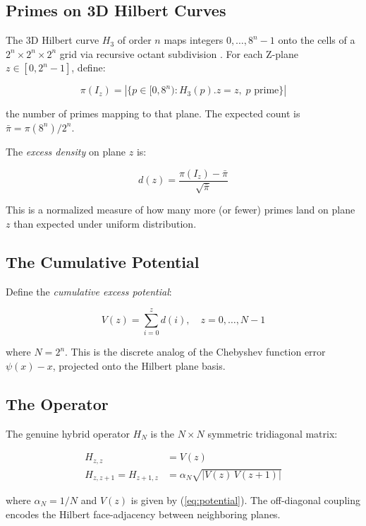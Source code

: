 \documentclass[11pt,a4paper]{article}
\theoremstyle{definition}
\begin{document}
\subsection{Primes on 3D Hilbert Curves}

The 3D Hilbert curve $H_3$ of order $n$ maps integers
$0,\ldots,8^n-1$ onto the cells of a $2^n \times 2^n \times 2^n$
grid via recursive octant subdivision \cite{hilbert1891}. For each
Z-plane $z \in [0, 2^n-1]$, define:

\[
\pi(I_z) = |\{p \in [0, 8^n) : H_3(p).z = z,\; p \text{ prime}\}|
\]

the number of primes mapping to that plane. The expected count is
$\bar{\pi} = \pi(8^n) / 2^n$.

The \emph{excess density} on plane $z$ is:

\[
d(z) = \frac{\pi(I_z) - \bar{\pi}}{\sqrt{\bar{\pi}}}
\]

This is a normalized measure of how many more (or fewer) primes land
on plane $z$ than expected under uniform distribution.

\subsection{The Cumulative Potential}

Define the \emph{cumulative excess potential}:

\begin{equation}\label{eq:potential}
V(z) = \sum_{i=0}^{z} d(i), \quad z = 0,\ldots,N-1
\end{equation}

where $N = 2^n$. This is the discrete analog of the Chebyshev function
error $\psi(x) - x$, projected onto the Hilbert plane basis.

\subsection{The Operator}

The genuine hybrid operator $H_N$ is the $N \times N$ symmetric
tridiagonal matrix:

\begin{align}
H_{z,z} &= V(z) \\
H_{z,z+1} = H_{z+1,z} &= \alpha_N \sqrt{|V(z)\,V(z+1)|}
\end{align}

where $\alpha_N = 1/N$ and $V(z)$ is given by (\ref{eq:potential}).
The off-diagonal coupling encodes the Hilbert face-adjacency between
neighboring planes.
\end{document}
